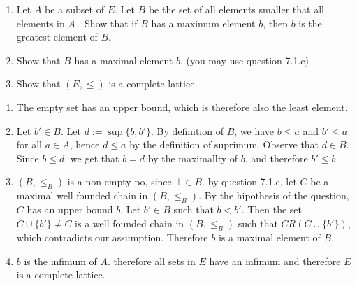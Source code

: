 \documentclass[a4paper,11pt]{exam}
\begin{document}
\begin{questions}
\begin{enumerate}
\begin{enumerate}
				\item Let $ A $ be a subset of $ E $. Let $ B $ be the set of all elements smaller that all elements in $A $ . Show that if $ B $ has a maximum element $ b $, then $ b $ is the greatest element of $ B $.
				
				
				\item Show that $B$ has a maximal element $b$. (you may use question 7.1.c)
				
				\item Show that $(E, \leq)$ is a complete lattice.
			\end{enumerate}
			
			
			\begin{solution}
				\begin{enumerate}
					\item The empty set has an upper bound, which is therefore also the least element.
					
					\item Let $b' \in B$. Let $d := \sup \{b,b'\}$. By definition of $B$, we have $b \leq a$ and $b' \leq a$ for all $a \in A$, hence $d \leq a$ by the definition of suprimum. Observe that $d \in B$. Since $b \leq d$, we get that $b = d$ by the maximallty of $b$, and therefore $b' \leq b$. 
					
					
					\item $(B, \leq_B)$ is a non empty po, since $\bot \in B$. by question 7.1.c, let $C$ be a maximal well founded chain in $(B, \leq_B)$. By the hipothesis of the question, $C$ has an upper bound $b$. Let $b' \in B$ such that $b < b'$.  Then the set $C \cup \{b'\} \neq C$ is a well founded chain in $(B, \leq_B)$ such that $CR(C \cup \{b'\})$, which contradicts our assumption. Therefore $b$ is a maximal element of $B$.
					
					\item $b$ is the infimum of $A$. therefore all sets in $E$ have an infimum and therefore $E$ is a complete lattice.
				\end{enumerate}
				
			\end{solution}
		\end{enumerate}
		
		
	\end{questions}
	
\end{document}
